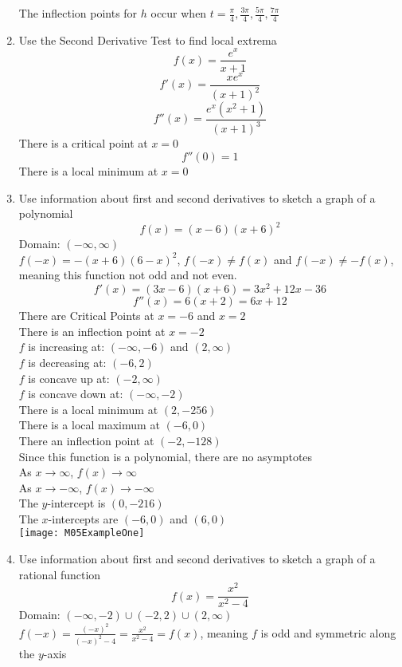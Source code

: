 \documentclass{article}
\begin{document}
\begin{enumerate}
    The inflection points for $h$ occur when $t = \frac{\pi}{4}, \frac{3\pi}{4}, \frac{5\pi}{4}, \frac{7\pi}{4}$
    \item Use the Second Derivative Test to find local extrema
    $$f(x) = \frac{e^x}{x + 1}$$
    $$f'(x) = \frac{xe^x}{\left(x + 1\right)^2}$$
    $$f''(x) = \frac{e^x\left(x^2+1\right)}{\left(x+1\right)^3}$$
    There is a critical point at $x = 0$
    $$f''(0) = 1$$
    There is a local minimum at $x = 0$
    \item Use information about first and second derivatives to sketch a graph of a polynomial
    $$f(x) = (x - 6)(x + 6)^2$$
    Domain: $(-\infty, \infty)$ \\
    $f(-x) = -(x + 6)(6 - x)^2$, $f(-x) \neq f(x)$ and $f(-x) \neq -f(x)$, meaning this function not odd and not even. \\
    $$f'(x) = (3x - 6)(x + 6) = 3x^2+12x-36$$
    $$f''(x) = 6(x + 2) = 6x+12$$
    There are Critical Points at $x = -6$ and $x = 2$ \\
    There is an inflection point at $x = -2$ \\
    $f$ is increasing at: $(-\infty, -6)$ and $(2, \infty)$ \\
    $f$ is decreasing at: $(-6, 2)$ \\
    $f$ is concave up at: $(-2, \infty)$ \\
    $f$ is concave down at: $(-\infty, -2)$ \\
    There is a local minimum at $(2, -256)$ \\
    There is a local maximum at $(-6, 0)$ \\
    There an inflection point at $(-2, -128)$ \\
    Since this function is a polynomial, there are no asymptotes \\
    As $x \to \infty$, $f(x) \to \infty$ \\
    As $x \to -\infty$, $f(x) \to -\infty$ \\
    The $y$-intercept is $(0, -216)$ \\
    The $x$-intercepts are $(-6, 0)$ and $(6, 0)$ \\
    \texttt{[image: M05ExampleOne]}
    \item Use information about first and second derivatives to sketch a graph of a rational function
    $$f(x) = \frac{x^2}{x^2 - 4}$$
    Domain: $(-\infty, -2)\cup(-2, 2)\cup(2, \infty)$ \\
    $f(-x) = \frac{\left(-x\right)^2}{\left(-x\right)^2 - 4} = \frac{x^2}{x^2 - 4} = f(x)$, meaning $f$ is odd and symmetric along the $y$-axis

\end{enumerate}
\end{document}
